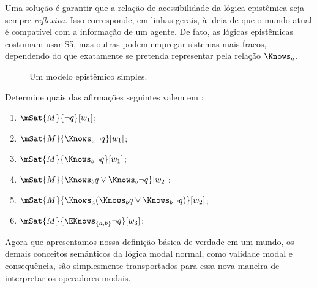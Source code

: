 \documentclass[../../../include/open-logic-section]{subfiles}
\begin{document}
Uma solução é garantir que a relação de acessibilidade da lógica
epistêmica seja sempre \emph{reflexiva}. Isso corresponde, em linhas
gerais, à ideia de que o mundo atual é compatível com a informação de
um agente. De fato, as lógicas epistêmicas costumam usar S5, mas outras
podem empregar sistemas mais fracos, dependendo do que exatamente se
pretenda representar pela relação $\Knows_a$.

\begin{figure}
  \begin{center}
  \end{center}
  \caption{Um modelo epistêmico simples.}
\end{figure}

\begin{prob}
  Determine quais das afirmações seguintes valem em
  :
  \begin{enumerate}
    \item $\mSat{M}{\lnot q}[w_1]$;
    \item $\mSat{M}{\Knows_a \lnot q}[w_1]$;
    \item $\mSat{M}{\Knows_b \lnot q}[w_1]$;
    \item $\mSat{M}{\Knows_b q \lor \Knows_b \lnot q}[w_2]$;
    \item $\mSat{M}{\Knows_a( \Knows_b q \lor \Knows_b \lnot q)}[w_2]$;
    \item $\mSat{M}{\EKnows_{\{a,b\}} \lnot q}[w_3]$;
    \end{enumerate}
\end{prob}

Agora que apresentamos nossa definição básica de verdade em um mundo,
os demais conceitos semânticos da lógica modal normal, como validade
modal e consequência, são simplesmente transportados para essa nova
maneira de interpretar os operadores modais.
\end{document}
